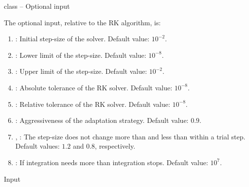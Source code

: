 \documentclass[10pt,utf8,compress,xcolor=dvipsnames]{beamer}
\begin{document}
\begin{frame}{ class -- Optional input}
	\fontB
	
	The optional input, relative to the RK algorithm, is:\\[0.5cm]
	\begin{enumerate}
		\item {}: Initial step-size of the solver. Default value: $10^{-2}$.
		\item {}: Lower limit of the step-size. Default value:  $10^{-8}$.
		\item {}: Upper limit of the step-size. Default value:  $10^{-2}$.
		\item {}: Absolute tolerance of the RK solver.  Default value:  $10^{-8}$.
		\item {}: Relative tolerance of the RK solver.  Default value:  $10^{-8}$.
		\item {}: Aggressiveness of the adaptation strategy.  Default value:  $0.9$.
		\item {}, : The step-size does not change more than  and less than  within a trial step. Default values: $1.2$ and $0.8$, respectively.
		\item {}: If integration needs more than  integration stops. Default value: $10^7$.
	\end{enumerate}
\end{frame}





\begin{frame}[noframenumbering]
	\begin{center}
		{\color{yellow} \Huge \PY  Input}
	\end{center}
\end{frame}
%
\end{document}

